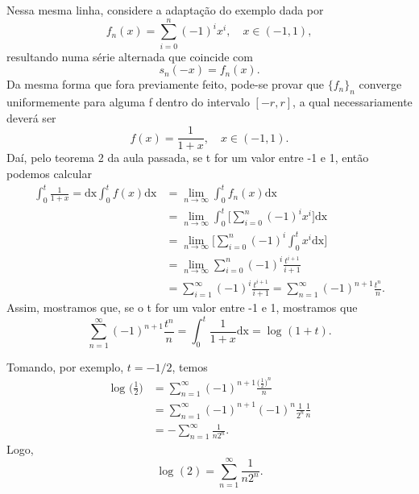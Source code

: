 \documentclass[../analysisII_notes.tex]{subfiles}
\begin{document}
\begin{example}
	Nessa mesma linha, considere a adaptação do exemplo dada por
	\[
		f_{n}(x) = \sum\limits_{i=0}^{n}(-1)^{i}x^{i},\quad x\in (-1, 1),
	\]
	resultando numa série alternada que coincide com
	\[
		s_{n}(-x) = f_{n}(x).
	\]
	Da mesma forma que fora previamente feito, pode-se provar que \(\{f_{n}\}_{n}\) converge uniformemente para alguma f dentro do intervalo \([-r, r]\), a qual necessariamente deverá ser
	\[
		f(x) = \frac{1}{1+x},\quad x\in (-1, 1).
	\]
	Daí, pelo teorema 2 da aula passada, se t for um valor entre -1 e 1, então podemos calcular
	\begin{align*}
		\int_{0}^{t}\frac{1}{1+x}= \mathrm{dx}\int_{0}^{t}f(x) \mathrm{dx} & = \lim_{n\to \infty}\int_{0}^{t}f_{n}(x) \mathrm{dx}                                                           \\
		                                                                   & = \lim_{n\to \infty}\int_{0}^{t}\biggl[\sum\limits_{i=0}^{n}(-1)^{i}x^{i}\biggr] \mathrm{dx}                   \\
		                                                                   & = \lim_{n\to \infty}\biggl[\sum\limits_{i=0}^{n}(-1)^{i}\int_{0}^{t}x^{i} \mathrm{dx}\biggr]                   \\
		                                                                   & = \lim_{n\to \infty}\sum\limits_{i=0}^{n}(-1)^{i}\frac{t^{i+1}}{i+1}                                           \\
		                                                                   & = \sum\limits_{i=1}^{\infty}(-1)^{i}\frac{t^{i+1}}{i+1} = \sum\limits_{n=1}^{\infty}(-1)^{n+1}\frac{t^{n}}{n}.
	\end{align*}
	Assim, mostramos que, se o t for um valor entre -1 e 1, mostramos que
	\[
		\sum\limits_{n=1}^{\infty}(-1)^{n+1}\frac{t^{n}}{n} = \int_{0}^{t}\frac{1}{1+x} \mathrm{dx} = \log^{}{(1+t)}.
	\]

	Tomando, por exemplo, \(t=-1/2\), temos
	\begin{align*}
		\log^{}{\biggl(\frac{1}{2}\biggr)} & = \sum\limits_{n=1}^{\infty}(-1)^{n+1}\frac{\biggl(\frac{1}{2}\biggr)^{n}}{n} \\
		                                   & = \sum\limits_{n=1}^{\infty}(-1)^{n+1}(-1)^{n}\frac{1}{2^{n}}\frac{1}{n}      \\
		                                   & = -\sum\limits_{n=1}^{\infty}\frac{1}{n2^{n}}.
	\end{align*}
	Logo,
	\[
		\log^{}{(2)} = \sum\limits_{n=1}^{\infty}\frac{1}{n2^{n}}.
	\]
\end{example}
\end{document}
